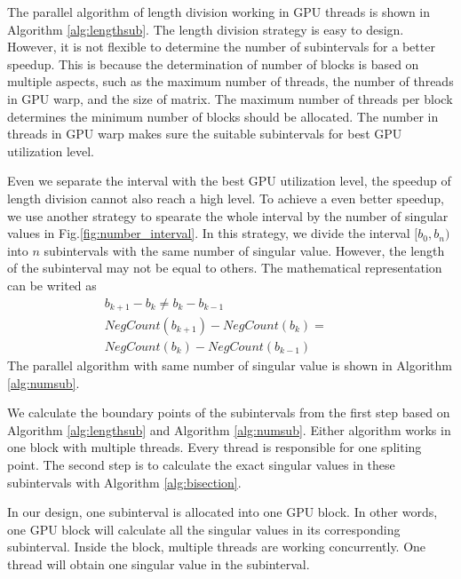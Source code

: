 
The parallel algorithm of length division working in GPU threads is shown in Algorithm \ref{alg:lengthsub}.
The length division strategy is easy to design.
However, it is not flexible to determine the number of subintervals for a better speedup.
This is because the determination of number of blocks is based on multiple aspects, such as the maximum number of threads, the number of threads in GPU warp, and the size of matrix.
The maximum number of threads per block determines the minimum number of blocks should be allocated.
The number in threads in GPU warp makes sure the suitable subintervals for best GPU utilization level.

Even we separate the interval with the best GPU utilization level, the speedup of length division cannot also reach a high level.
To achieve a even better speedup, we use another strategy to spearate the whole interval by the number of singular values in Fig.\ref{fig:number_interval}.
In this strategy, we divide the interval $[b_0,b_n)$ into $n$ subintervals with the same number of singular value.
However, the length of the subinterval may not be equal to others.
The mathematical representation can be writed as %
\begin{eqnarray}
b_{k+1}-b_k \ne b_{k}-b_{k-1} \hspace{2cm} \\
NegCount(b_{k+1})-NegCount(b_{k}) = \hspace{1cm} \nonumber\\
NegCount(b_{k})-NegCount(b_{k-1})
\end{eqnarray}
The parallel algorithm with same number of singular value is shown in Algorithm \ref{alg:numsub}.


We calculate the boundary points of the subintervals from the first step based on Algorithm \ref{alg:lengthsub} and Algorithm \ref{alg:numsub}. 
Either algorithm works in one block with multiple threads.
Every thread is responsible for one spliting point.
The second step is to calculate the exact singular values in these subintervals with Algorithm \ref{alg:bisection}.

In our design, one subinterval is allocated into one GPU block.
In other words, one GPU block will calculate all the singular values in its corresponding subinterval.
Inside the block, multiple threads are working concurrently.
One thread will obtain one singular value in the subinterval.

